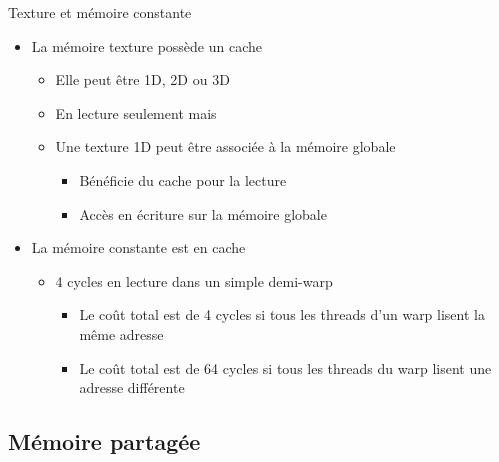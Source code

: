 \documentclass{beamer}
\begin{document}
\begin{frame}{Texture et mémoire constante}

\begin{itemize}
\item La mémoire texture possède un cache
  \begin{itemize}
  \item Elle peut être  1D, 2D ou 3D
  \item En lecture seulement \alert{mais}
  \item Une texture 1D peut être associée à la mémoire globale
    \begin{itemize}
    \item Bénéficie du cache pour la lecture
    \item Accès en écriture sur la mémoire globale
    \end{itemize}
  \end{itemize}
\item La mémoire constante est en cache
  \begin{itemize}
  \item 4 cycles en lecture dans un simple demi-warp
    \begin{itemize}
    \item Le coût total est de 4 cycles si tous les threads d'un warp lisent la même adresse
    \item Le coût total est de 64 cycles si tous les threads du warp lisent une adresse différente
    \end{itemize}
  \end{itemize}
\end{itemize}
\end{frame}

\subsection{Mémoire partagée}
\end{document}

